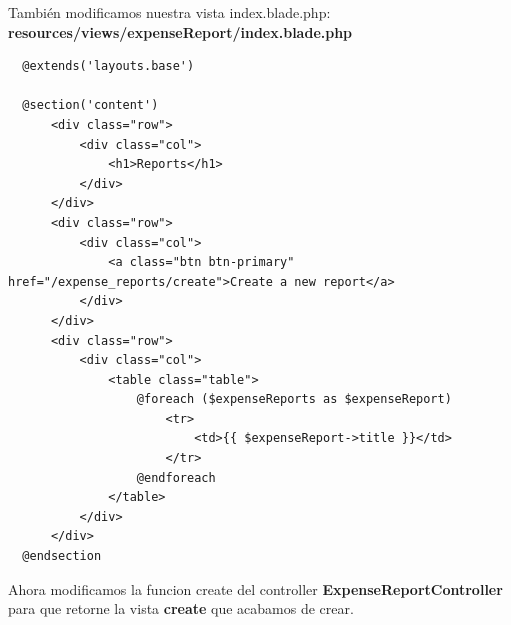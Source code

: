 \documentclass{article}
\begin{document}
También modificamos nuestra vista index.blade.php:\\

\textbf{resources/views/expenseReport/index.blade.php}
\begin{verbatim}
  @extends('layouts.base')

  @section('content')
      <div class="row">
          <div class="col">
              <h1>Reports</h1>
          </div>
      </div>
      <div class="row">
          <div class="col">
              <a class="btn btn-primary" href="/expense_reports/create">Create a new report</a>
          </div>
      </div>
      <div class="row">
          <div class="col">
              <table class="table">
                  @foreach ($expenseReports as $expenseReport)
                      <tr>
                          <td>{{ $expenseReport->title }}</td>
                      </tr>
                  @endforeach
              </table>
          </div>
      </div>
  @endsection
\end{verbatim}

Ahora modificamos la funcion create del controller
\textbf{ExpenseReportController} para que retorne la vista \textbf{create} que
acabamos de crear.\\
\end{document}
